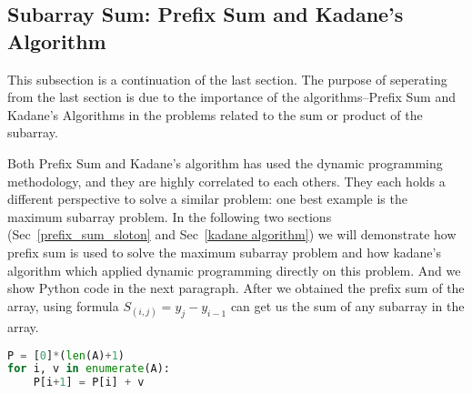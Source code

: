 \documentclass[../main.tex]{subfiles}
\begin{document}

\subsection{Subarray Sum: Prefix Sum and Kadane's Algorithm}
\label{dp_single_n_prefix}
This subsection is a continuation of the last section. The purpose of seperating from the last section is due to the importance of the algorithms--Prefix Sum and Kadane's Algorithms in the problems related to the sum or product of the subarray. 

Both Prefix Sum and Kadane's algorithm has used the dynamic programming methodology, and they are  highly correlated to each others. They each holds a  different perspective to solve a similar problem: one best example is the maximum subarray problem. 
 In the following two sections (Sec~\ref{prefix_sum_sloton} and Sec~\ref{kadane algorithm}) we will demonstrate how prefix sum is used to solve the maximum subarray problem and how kadane's algorithm which applied dynamic programming directly on this problem. 
And we show Python code in the next paragraph. After we obtained the prefix sum of the array, using  formula $S_{(i,j)} = y_j-y_{i-1}$ can get us the sum of any subarray in the array. 
\begin{lstlisting}[language=Python]
P = [0]*(len(A)+1)
for i, v in enumerate(A):
    P[i+1] = P[i] + v
\end{lstlisting}
\end{document}
